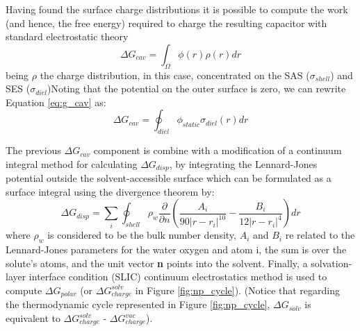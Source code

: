 Having found the surface charge distributions it is possible to compute the work (and hence, the free energy) required to charge the resulting capacitor with standard electrostatic theory
\begin{equation}
    \Delta G_{cav}=\int_{\Omega}\phi(r)\rho(r)dr
    \label{eq:g_cav}
\end{equation}
being $\rho$ the charge distribution, in this case, concentrated on the SAS ($\sigma_{shell}$) and SES ($\sigma_{diel}$)Noting that the potential on the outer surface is zero, we can rewrite Equation \ref{eq:g_cav} as: 
\begin{equation}
    \Delta G_{cav}=\oint_{diel}\phi_{static}\sigma_{diel}(r)dr
    \label{eq:int_shell}
\end{equation}

The previous $\Delta G_{cav}$ component is combine with a modification of a continuum integral method \cite{levy2003nonpolar} for calculating $\Delta G_{disp}$, by integrating the Lennard-Jones potential outside the solvent-accessible surface which can be formulated as a surface integral using the divergence theorem by: 
\begin{equation}
    \Delta G_{disp}=\sum_i \oint_{shell} \rho_w \frac{\partial}{\partial n}\left ( \frac{A_i}{90\left |r-r_i\right |^{10}} - \frac{B_i}{12\left |r-r_i\right |^{4}} \right )dr
    \label{eq:CC_implicit}
\end{equation}
where $\rho_w$ is considered to be the bulk number density, $A_i$ and $B_i$ re related to the Lennard-Jones parameters for the water oxygen and atom i, the sum is over the solute’s atoms, and the unit vector \textbf{n} points into the solvent.
Finally, a solvation-layer interface condition (SLIC) continuum electrostatics method   \cite{mehdizadeh2019solvation} is used to compute $\Delta G_{polar}$ (or $\Delta G_{charge}^{solv}$ in Figure \ref{fig:np_cycle}). (Notice that regarding the thermodynamic cycle represented in Figure \ref{fig:np_cycle},  $ \Delta G_{solv}$ is equivalent to $\Delta G_{charge}^{solv}$ - $\Delta G_{charge}^{vac}$).



 